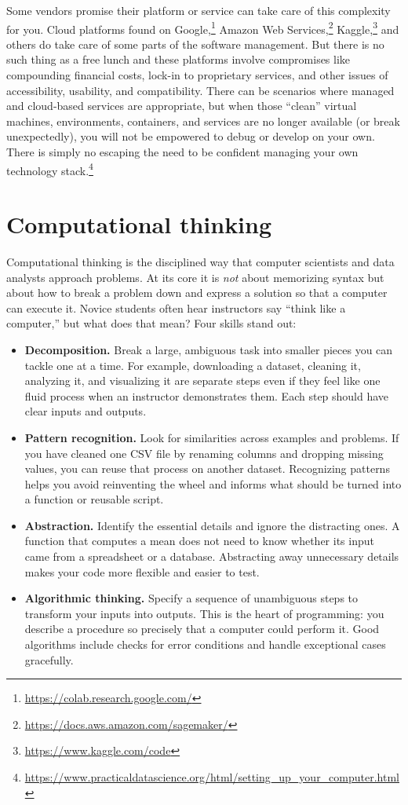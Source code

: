 Some vendors promise their platform or service can take care of this complexity for you. Cloud platforms found on Google,\footnote{\url{https://colab.research.google.com/}} Amazon Web Services,\footnote{\url{https://docs.aws.amazon.com/sagemaker/}} Kaggle,\footnote{\url{https://www.kaggle.com/code}} and others do take care of some parts of the software management. But there is no such thing as a free lunch and these platforms involve compromises like compounding financial costs, lock-in to proprietary services, and other issues of accessibility, usability, and compatibility. There can be scenarios where managed and cloud-based services are appropriate, but when those ``clean'' virtual machines, environments, containers, and services are no longer available (or break unexpectedly), you will not be empowered to debug or develop on your own. There is simply no escaping the need to be confident managing your own technology stack.\footnote{\url{https://www.practicaldatascience.org/html/setting_up_your_computer.html}}

\section{Computational thinking}
Computational thinking is the disciplined way that computer scientists and data analysts approach problems.  At its core it is \emph{not} about memorizing syntax but about how to break a problem down and express a solution so that a computer can execute it.  Novice students often hear instructors say “think like a computer,” but what does that mean?  Four skills stand out:

\begin{itemize}
  \item \textbf{Decomposition.}  Break a large, ambiguous task into smaller pieces you can tackle one at a time.  For example, downloading a dataset, cleaning it, analyzing it, and visualizing it are separate steps even if they feel like one fluid process when an instructor demonstrates them.  Each step should have clear inputs and outputs.
  \item \textbf{Pattern recognition.}  Look for similarities across examples and problems.  If you have cleaned one CSV file by renaming columns and dropping missing values, you can reuse that process on another dataset.  Recognizing patterns helps you avoid re\-inventing the wheel and informs what should be turned into a function or reusable script.
  \item \textbf{Abstraction.}  Identify the essential details and ignore the distracting ones.  A function that computes a mean does not need to know whether its input came from a spreadsheet or a database.  Abstracting away unnecessary details makes your code more flexible and easier to test.
  \item \textbf{Algorithmic thinking.}  Specify a sequence of unambiguous steps to transform your inputs into outputs.  This is the heart of programming: you describe a procedure so precisely that a computer could perform it.  Good algorithms include checks for error conditions and handle exceptional cases gracefully.
\end{itemize}

